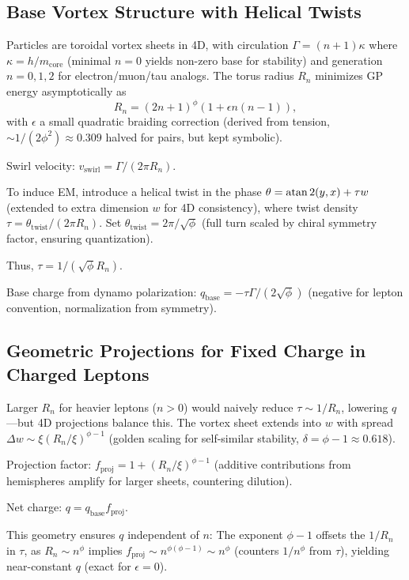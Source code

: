 \documentclass{article}
\begin{document}
\subsection{Base Vortex Structure with Helical Twists}

Particles are toroidal vortex sheets in 4D, with circulation $\Gamma = (n + 1) \kappa$ where $\kappa = h / m_{\text{core}}$ (minimal $n=0$ yields non-zero base for stability) and generation $n=0,1,2$ for electron/muon/tau analogs. The torus radius $R_n$ minimizes GP energy asymptotically as
\[
R_n = (2n + 1)^\phi \left(1 + \epsilon n (n-1)\right),
\]
with $\epsilon$ a small quadratic braiding correction (derived from tension, $\sim 1/(2\phi^2) \approx 0.309$ halved for pairs, but kept symbolic).

Swirl velocity: $v_{\text{swirl}} = \Gamma / (2\pi R_n)$.

To induce EM, introduce a helical twist in the phase $\theta = \atan2(y,x) + \tau w$ (extended to extra dimension $w$ for 4D consistency), where twist density $\tau = \theta_{\text{twist}} / (2\pi R_n)$. Set $\theta_{\text{twist}} = 2\pi / \sqrt{\phi}$ (full turn scaled by chiral symmetry factor, ensuring quantization).

Thus, $\tau = 1 / (\sqrt{\phi} R_n)$.

Base charge from dynamo polarization: $q_{\text{base}} = - \tau \Gamma / (2 \sqrt{\phi})$ (negative for lepton convention, normalization from symmetry).

\subsection{Geometric Projections for Fixed Charge in Charged Leptons}

Larger $R_n$ for heavier leptons ($n>0$) would naively reduce $\tau \sim 1/R_n$, lowering $q$---but 4D projections balance this. The vortex sheet extends into $w$ with spread $\Delta w \sim \xi (R_n / \xi)^{\phi - 1}$ (golden scaling for self-similar stability, $\delta = \phi - 1 \approx 0.618$).

Projection factor: $f_{\text{proj}} = 1 + (R_n / \xi)^{\phi - 1}$ (additive contributions from hemispheres amplify for larger sheets, countering dilution).

Net charge: $q = q_{\text{base}} f_{\text{proj}}$.

This geometry ensures $q$ independent of $n$: The exponent $\phi - 1$ offsets the $1/R_n$ in $\tau$, as $R_n \sim n^\phi$ implies $f_{\text{proj}} \sim n^{\phi (\phi - 1)} \sim n^\phi$ (counters $1/n^\phi$ from $\tau$), yielding near-constant $q$ (exact for $\epsilon=0$).
\end{document}
